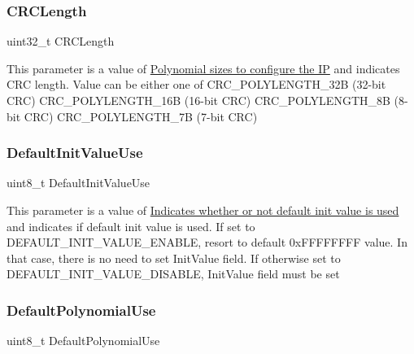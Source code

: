 \subsubsection{\texorpdfstring{C\+R\+C\+Length}{CRCLength}}
{\footnotesize\ttfamily uint32\+\_\+t C\+R\+C\+Length}

This parameter is a value of \hyperlink{group___c_r_c_ex___polynomial___sizes}{Polynomial sizes to configure the IP} and indicates C\+RC length. Value can be either one of C\+R\+C\+\_\+\+P\+O\+L\+Y\+L\+E\+N\+G\+T\+H\+\_\+32B (32-\/bit C\+RC) C\+R\+C\+\_\+\+P\+O\+L\+Y\+L\+E\+N\+G\+T\+H\+\_\+16B (16-\/bit C\+RC) C\+R\+C\+\_\+\+P\+O\+L\+Y\+L\+E\+N\+G\+T\+H\+\_\+8B (8-\/bit C\+RC) C\+R\+C\+\_\+\+P\+O\+L\+Y\+L\+E\+N\+G\+T\+H\+\_\+7B (7-\/bit C\+RC) \mbox{\label{struct_c_r_c___init_type_def_a995114f44b6488f784f24a9faa184813}} 
\subsubsection{\texorpdfstring{Default\+Init\+Value\+Use}{DefaultInitValueUse}}
{\footnotesize\ttfamily uint8\+\_\+t Default\+Init\+Value\+Use}

This parameter is a value of \hyperlink{group___c_r_c___default___init_value___use}{Indicates whether or not default init value is used} and indicates if default init value is used. If set to D\+E\+F\+A\+U\+L\+T\+\_\+\+I\+N\+I\+T\+\_\+\+V\+A\+L\+U\+E\+\_\+\+E\+N\+A\+B\+LE, resort to default 0x\+F\+F\+F\+F\+F\+F\+FF value. In that case, there is no need to set Init\+Value field. If otherwise set to D\+E\+F\+A\+U\+L\+T\+\_\+\+I\+N\+I\+T\+\_\+\+V\+A\+L\+U\+E\+\_\+\+D\+I\+S\+A\+B\+LE, Init\+Value field must be set \mbox{\label{struct_c_r_c___init_type_def_a310c3780f74e347a909fd5629011d4ed}} 
\subsubsection{\texorpdfstring{Default\+Polynomial\+Use}{DefaultPolynomialUse}}
{\footnotesize\ttfamily uint8\+\_\+t Default\+Polynomial\+Use}

